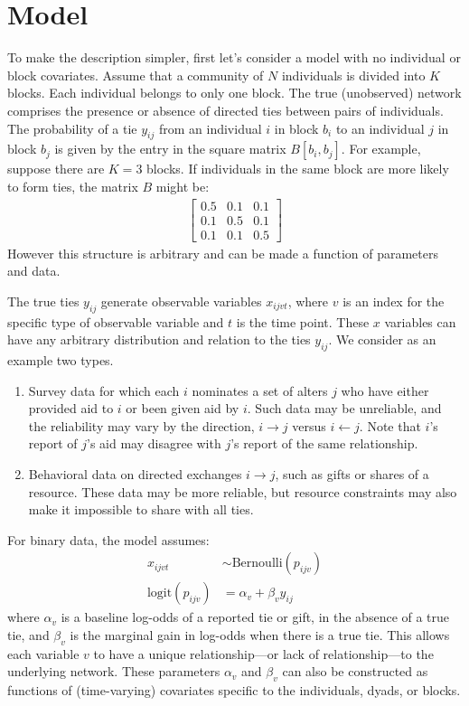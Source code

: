\documentclass[reqno,12pt,a4paper]{amsart}
\begin{document}
\section{Model}

To make the description simpler, first let's consider a model with no individual or block covariates. Assume that a community of $N$ individuals is divided into $K$ blocks. Each individual belongs to only one block. The true (unobserved) network comprises the presence or absence of directed ties between pairs of individuals. The probability of a tie $y_{ij}$ from an individual $i$ in block $b_i$ to an individual $j$ in block $b_j$ is given by the entry in the square matrix $B[b_i,b_j]$. For example, suppose there are $K=3$ blocks. If individuals in the same block are more likely to form ties, the matrix $B$ might be:
\begin{align*}
\begin{bmatrix}0.5 & 0.1 & 0.1 \\ 0.1 & 0.5 & 0.1 \\ 0.1 & 0.1 & 0.5 \end{bmatrix}
\end{align*}
However this structure is arbitrary and can be made a function of parameters and data.

The true ties $y_{ij}$ generate observable variables $x_{ijvt}$, where $v$ is an index for the specific type of observable variable and $t$ is the time point. These $x$ variables can have any arbitrary distribution and relation to the ties $y_{ij}$. We consider as an example two types.
\begin{enumerate}
\item Survey data for which each $i$ nominates a set of alters $j$ who have either provided aid to $i$ or been given aid by $i$. Such data may be unreliable, and the reliability may vary by the direction, $i \rightarrow j$ versus $i \leftarrow j$. Note that $i$'s report of $j$'s aid may disagree with $j$'s report of the same relationship.
\item Behavioral data on directed exchanges $i \rightarrow j$, such as gifts or shares of a resource. These data may be more reliable, but resource constraints may also make it impossible to share with all ties.
\end{enumerate}
For binary data, the model assumes:
\begin{align*}
	x_{ijvt} &\sim \mathrm{Bernoulli}( p_{ijv} )\\
	\mathrm{logit}(p_{ijv}) &= \alpha_v + \beta_v y_{ij}
\end{align*}
where $\alpha_v$ is a baseline log-odds of a reported tie or gift, in the absence of a true tie, and $\beta_v$ is the marginal gain in log-odds when there is a true tie. This allows each variable $v$ to have a unique relationship---or lack of relationship---to the underlying network. These parameters $\alpha_v$ and $\beta_v$ can also be constructed as functions of (time-varying) covariates specific to the individuals, dyads, or blocks.
\end{document}
